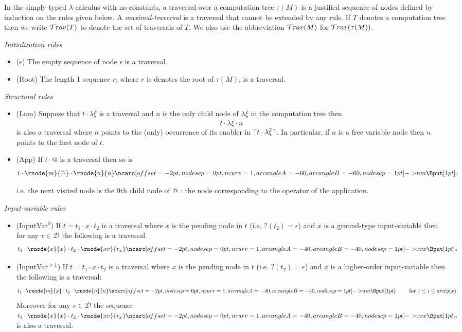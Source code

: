 \begin{dfn}
\label{def:traversal}
In the simply-typed $\lambda$-calculus with no constants,
a traversal over a computation tree $\tau(M)$
is a justified sequence of nodes defined by induction on the rules
given below. A \emph{maximal-traversal} is a traversal that cannot be
extended by any rule. If $T$ denotes a computation tree then we write $\mathcal{T}rav(T)$
to denote the set of traversals of $T$. We also use the abbreviation $\mathcal{T}rav(M)$ for $\mathcal{T}rav(\tau(M))$.

\emph{Initialization rules}
\begin{itemize}
\item ($\epsilon$) The empty sequence of node $\epsilon$ is a traversal.
\item (Root) The length 1 sequence $r$, where $r$ is denotes the root of $\tau(M)$, is a traversal.
\end{itemize}

\emph{Structural rules}
\begin{itemize}
\item (Lam) Suppose that $t \cdot \lambda \overline{\xi}$ is a traversal and $n$ is the only child node of $\lambda \overline{\xi}$ in
the computation tree then
$$t \cdot \lambda \overline{\xi} \cdot n$$
is also a traversal
where $n$ points to the (only) occurrence of its enabler in $\ulcorner t \cdot \lambda \overline{\xi} \urcorner$.
In particular, if $n$ is a free variable node then $n$ points to the first node of $t$.

\item (App) If $t \cdot @$ is a traversal then so is
$$t \cdot \rnode{m}{@} \cdot
\rnode{n}{n} \bkptr[nodesep=1pt]{60}{n}{m} \bklabelc{0}
$$

i.e. the next visited node is the $0$th child node of @ : the
node corresponding to the operator of the application.
\end{itemize}

\emph{Input-variable rules}
\begin{itemize}
\item (InputVar$^0$) If $t = t_1 \cdot x \cdot t_2$ is a traversal where
$x$ is the pending node in $t$ (i.e. $?(t_2)=\epsilon$)
and $x$ is a ground-type input-variable then for any $v \in \mathcal{D}$ the following is a traversal
$$t_1 \cdot \rnode{x}{x} \cdot t_2 \cdot \rnode{xv}{v_x}
\bkptr[nodesep=1pt]{40}{xv}{x} \bklabelc{v}$$


\item (InputVar$^{\geq 1}$)
If $t = t_1 \cdot x \cdot t_2$ is a traversal where
$x$ is the pending node in $t$ (i.e. $?(t_2)=\epsilon$)
and $x$ is a higher-order input-variable then the following is a traversal:
$$t_1 \cdot \rnode{m}{x} \cdot t_2 \cdot
\rnode{n}{n} \bkptr[nodesep=1pt]{40}{n}{m} \bklabelc{i} \qquad
\mbox{ for } 1 \leq i \leq arity(x).$$
Moreover for any $v\in \mathcal{D}$ the sequence $t_1 \cdot \rnode{x}{x} \cdot t_2 \cdot
\rnode{xv}{v_x} \bkptr[nodesep=1pt]{40}{xv}{x} \bklabelc{v}$ is also a traversal.
\end{itemize}


\end{dfn}
